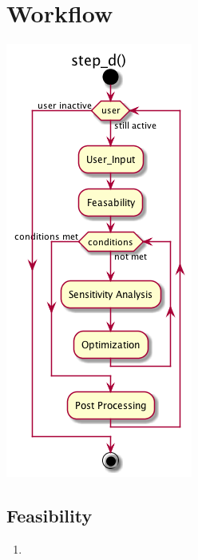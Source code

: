 \documentclass[11pt]{article}
\begin{document}
\section{Workflow}
	 \begin{center}\includegraphics[scale=.5]{IMSM_Workflow.png}\end{center}

\subsection{Feasibility}
	\begin{enumerate}
		\item 
	\end{enumerate}
\end{document}
